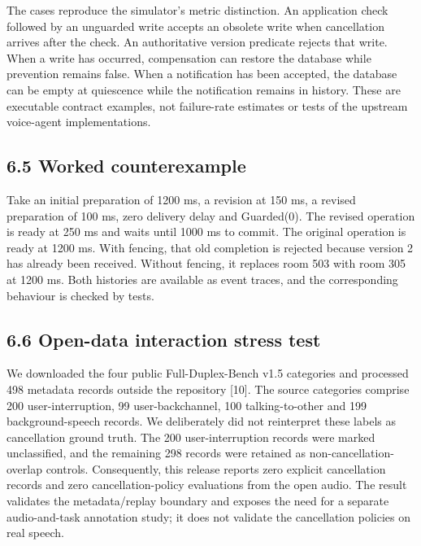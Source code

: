 \documentclass[10pt]{article}
\begin{document}
The cases reproduce the simulator's metric distinction. An application check followed by an unguarded write accepts an obsolete write when cancellation arrives after the check. An authoritative version predicate rejects that write. When a write has occurred, compensation can restore the database while prevention remains false. When a notification has been accepted, the database can be empty at quiescence while the notification remains in history. These are executable contract examples, not failure-rate estimates or tests of the upstream voice-agent implementations.


\subsection*{6.5 Worked counterexample}

Take an initial preparation of 1200 ms, a revision at 150 ms, a revised preparation of 100 ms, zero delivery delay and Guarded(0). The revised operation is ready at 250 ms and waits until 1000 ms to commit. The original operation is ready at 1200 ms. With fencing, that old completion is rejected because version 2 has already been received. Without fencing, it replaces room 503 with room 305 at 1200 ms. Both histories are available as event traces, and the corresponding behaviour is checked by tests.


\subsection*{6.6 Open-data interaction stress test}

We downloaded the four public Full-Duplex-Bench v1.5 categories and processed 498 metadata records outside the repository [10]. The source categories comprise 200 user-interruption, 99 user-backchannel, 100 talking-to-other and 199 background-speech records. We deliberately did not reinterpret these labels as cancellation ground truth. The 200 user-interruption records were marked unclassified, and the remaining 298 records were retained as non-cancellation-overlap controls. Consequently, this release reports zero explicit cancellation records and zero cancellation-policy evaluations from the open audio. The result validates the metadata/replay boundary and exposes the need for a separate audio-and-task annotation study; it does not validate the cancellation policies on real speech.
\end{document}
